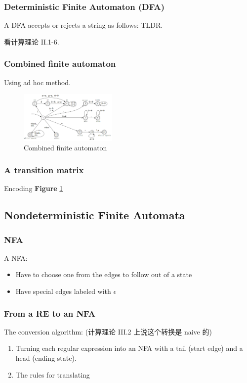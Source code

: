 \subsubsection{Deterministic Finite Automaton (DFA)}
A DFA accepts or rejects a string as follows: TLDR. 

看计算理论 II.1-6.

\subsubsection{Combined finite automaton}
Using ad hoc method.

\begin{figure}[!htb]
    \centering
    \includegraphics[width=0.42\textwidth]{pic/CP2/Combined finite automaton}
    \caption{Combined finite automaton}
    \label{fig:CDFA}
\end{figure}

\subsubsection{A transition matrix}
Encoding \textbf{Figure} \ref{fig:CDFA}

\subsection{Nondeterministic Finite Automata}
\subsubsection{NFA}
A NFA: 
\begin{itemize}
    \item Have to choose one from the edges to follow out of a state
    \item Have special edges labeled with $\epsilon$
\end{itemize}

\subsubsection{From a RE to an NFA}
The conversion algorithm: (计算理论 III.2 上说这个转换是 naive 的)
\begin{enumerate}
    \item Turning each regular expression into an NFA with a tail (start edge) and a head (ending state).
    \item The rules for translating
\end{enumerate}

